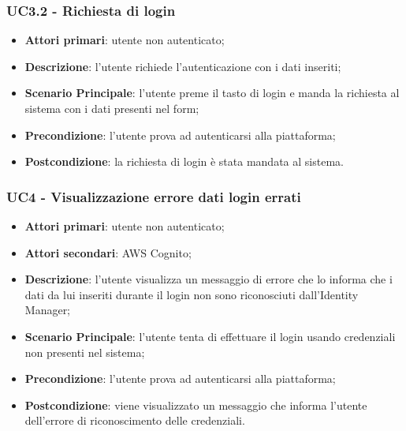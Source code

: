 \subsubsection{UC3.2 - Richiesta di login}
\begin{itemize}
\item \textbf{Attori primari}: utente non autenticato;
\item \textbf{Descrizione}: l'utente richiede l'autenticazione con i dati inseriti;
\item \textbf{Scenario Principale}: l'utente preme il tasto di login e manda la richiesta al sistema con i dati presenti nel form;
\item \textbf{Precondizione}: l'utente prova ad autenticarsi alla piattaforma;
\item \textbf{Postcondizione}: la richiesta di login è stata mandata al sistema.
\end{itemize} 

\subsubsection{UC4 - Visualizzazione errore dati login errati}
\begin{itemize}
\item \textbf{Attori primari}: utente non autenticato;
\item \textbf{Attori secondari}:  AWS Cognito;
\item \textbf{Descrizione}: l'utente visualizza un messaggio di errore che lo informa che i dati da lui inseriti durante il login non sono riconosciuti dall'Identity Manager;
\item \textbf{Scenario Principale}: l'utente tenta di effettuare il login usando credenziali non presenti nel sistema;
\item \textbf{Precondizione}: l'utente prova ad autenticarsi alla piattaforma;
\item \textbf{Postcondizione}: viene visualizzato un messaggio che informa l'utente dell'errore di riconoscimento delle credenziali.
\end{itemize}